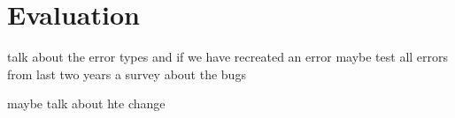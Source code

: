 
\chapter{Evaluation}\label{chapter:evaluation}



talk about the error types 
and if we have recreated an error
maybe test all errors from last two years
a survey about the bugs

maybe talk about hte change